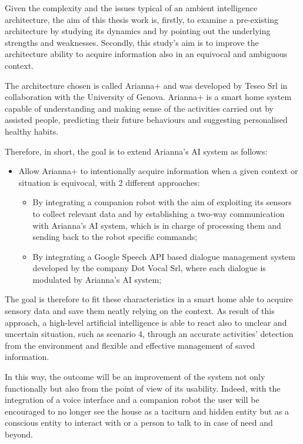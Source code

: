 \documentclass{thesisreport}
\begin{document}
 Given the complexity and the issues typical of an ambient intelligence architecture, the aim of this thesis work is, firstly, to examine a pre-existing architecture by studying its dynamics and by pointing out the underlying strengths and weaknesses. Secondly, this study’s aim is to improve the architecture ability to acquire information also in an equivocal and ambiguous context.
 
 The architecture chosen is called Arianna+ and was developed by Teseo Srl in collaboration with the University of Genova. Arianna+ is a smart home system capable of understanding and making sense of the activities carried out by assisted people, predicting their future behaviours and suggesting personalised healthy habits.
 
 Therefore, in short, the goal is to extend Arianna's AI system as follows:
 \begin{itemize}
     \item Allow Arianna+ to intentionally acquire information when a given context or situation is equivocal, with 2 different approaches:
     \begin{itemize}
         \item By integrating a companion robot with the aim of exploiting its sensors to collect relevant data and by establishing a two-way communication with Arianna’s AI system, which is in charge of processing them and sending back to the robot specific commands;
         \item By integrating a Google Speech API based dialogue management system developed by the company Dot Vocal Srl, where each dialogue is modulated by Arianna’s AI system; 
     \end{itemize}
 \end{itemize}

 The goal is therefore to fit these characteristics in a smart home able to acquire sensory data and save them neatly relying on the context. As result of this approach, a high-level artificial intelligence is able to react also to unclear and uncertain situation, such as scenario 4, through an accurate activities’ detection from the environment and flexible and effective management of saved information.
 
 In this way, the outcome will be an improvement of the system not only functionally but also from the point of view of its usability.
 Indeed, with the integration of a voice interface and a companion robot the user will be encouraged to no longer see the house as a taciturn and hidden entity but as a conscious entity to interact with or a person to talk to in case of need and beyond.
 
\end{document}
